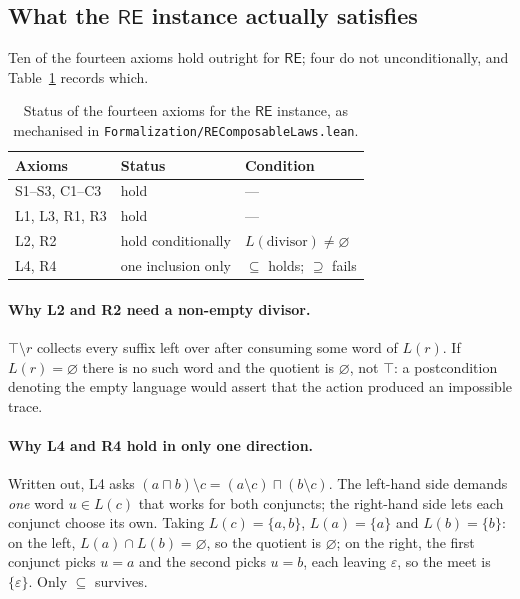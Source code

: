 \documentclass[acmsmall,screen]{acmart}
\newcommand{\RE}{\mathsf{RE}}
\newcommand{\lquot}{\mathbin{\setminus}}   %
\begin{document}
\subsection{What the \texorpdfstring{$\RE$}{RE} instance actually satisfies}
\label{sec:boundary}

Ten of the fourteen axioms hold outright for $\RE$; four do not
unconditionally, and Table~\ref{tab:axiom-status} records which.

\begin{table}[ht]
\caption{Status of the fourteen axioms for the $\RE$ instance, as mechanised
         in \texttt{Formalization/REComposableLaws.lean}.}
\label{tab:axiom-status}
\small
\begin{tabular}{lll}
\toprule
Axioms & Status & Condition \\
\midrule
S1--S3, C1--C3 & hold & --- \\
L1, L3, R1, R3 & hold & --- \\
L2, R2         & hold conditionally & $L(\text{divisor}) \neq \varnothing$ \\
L4, R4         & one inclusion only & $\subseteq$ holds; $\supseteq$ fails \\
\bottomrule
\end{tabular}
\end{table}

\paragraph{Why L2 and R2 need a non-empty divisor.}
$\top \lquot r$ collects every suffix left over after consuming some word of
$L(r)$.
If $L(r) = \varnothing$ there is no such word and the quotient is
$\varnothing$, not $\top$: a postcondition denoting the empty language would
assert that the action produced an impossible trace.

\paragraph{Why L4 and R4 hold in only one direction.}
Written out, L4 asks
$(a \sqcap b) \lquot c = (a \lquot c) \sqcap (b \lquot c)$.
The left-hand side demands \emph{one} word $u \in L(c)$ that works for both
conjuncts; the right-hand side lets each conjunct choose its own.
Taking $L(c) = \{a, b\}$, $L(a) = \{a\}$ and $L(b) = \{b\}$: on the left,
$L(a) \cap L(b) = \varnothing$, so the quotient is $\varnothing$; on the
right, the first conjunct picks $u = a$ and the second picks $u = b$, each
leaving $\varepsilon$, so the meet is $\{\varepsilon\}$.
Only $\subseteq$ survives.
\end{document}
